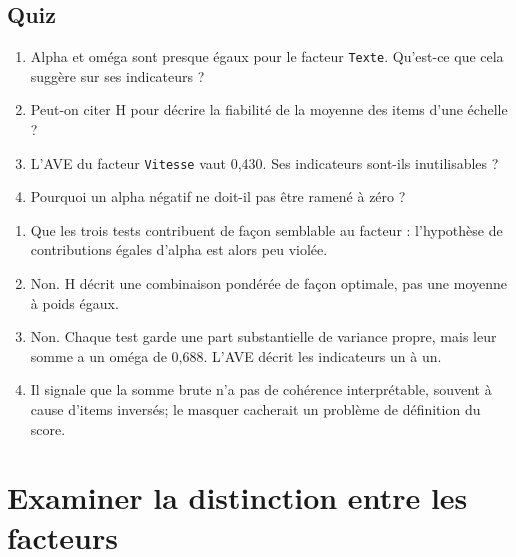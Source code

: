 \documentclass[
  french,
  11pt,
  a4paper,
  DIV=11,
  numbers=noendperiod]{scrreprt}
\providecommand{\tightlist}{%
  \setlength{\itemsep}{0pt}\setlength{\parskip}{0pt}}
\begin{document}
\section{Quiz}\label{quiz-5}

\begin{enumerate}
\def\labelenumi{\arabic{enumi}.}
\tightlist
\item
  Alpha et oméga sont presque égaux pour le facteur \texttt{Texte}.
  Qu'est-ce que cela suggère sur ses indicateurs ?
\item
  Peut-on citer H pour décrire la fiabilité de la moyenne des items
  d'une échelle ?
\item
  L'AVE du facteur \texttt{Vitesse} vaut 0,430. Ses indicateurs sont-ils
  inutilisables ?
\item
  Pourquoi un alpha négatif ne doit-il pas être ramené à zéro ?
\end{enumerate}

\begin{tcolorbox}[enhanced jigsaw, arc=.35mm, bottomrule=.15mm, bottomtitle=1mm, breakable, colback=white, colbacktitle=quarto-callout-tip-color!10!white, colframe=quarto-callout-tip-color-frame, coltitle=black, left=2mm, leftrule=.75mm, opacityback=0, opacitybacktitle=0.6, rightrule=.15mm, title={Réponses}, titlerule=0mm, toprule=.15mm, toptitle=1mm]

\begin{enumerate}
\def\labelenumi{\arabic{enumi}.}
\tightlist
\item
  Que les trois tests contribuent de façon semblable au facteur :
  l'hypothèse de contributions égales d'alpha est alors peu violée.
\item
  Non. H décrit une combinaison pondérée de façon optimale, pas une
  moyenne à poids égaux.
\item
  Non. Chaque test garde une part substantielle de variance propre, mais
  leur somme a un oméga de 0,688. L'AVE décrit les indicateurs un à un.
\item
  Il signale que la somme brute n'a pas de cohérence interprétable,
  souvent à cause d'items inversés; le masquer cacherait un problème de
  définition du score.
\end{enumerate}

\end{tcolorbox}


\chapter{Examiner la distinction entre les facteurs}\label{sec-validite}
\end{document}
